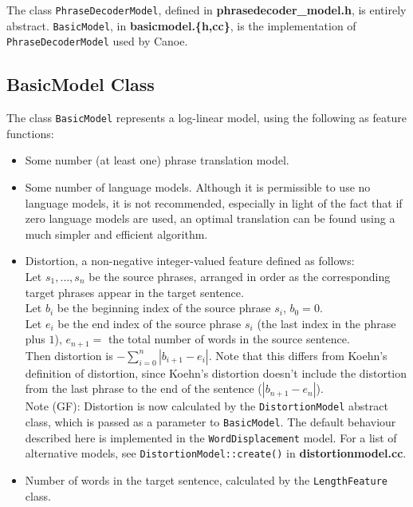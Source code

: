 \documentclass[12pt]{amsart} \usepackage{epsfig} \usepackage{rotating}
\newcommand{\file}{\textbf} \newcommand{\url}{\underline}
\newcommand{\code}{\small\texttt}
\begin{document}
The class \code{PhraseDecoderModel}, defined in \file{phrasedecoder\_model.h},
is entirely abstract.  \code{BasicModel}, in \file{basicmodel.\{h,cc\}}, is the
implementation of \code{PhraseDecoderModel} used by Canoe.

\subsection{BasicModel Class}
The class \code{BasicModel} represents a log-linear model, using the following
as feature functions:

\begin{itemize}

\item
Some number (at least one) phrase translation model.

\item
Some number of language models.  Although it is
permissible to use no language models, it is not recommended, especially in
light of the fact that if zero language models are used, an optimal translation
can be found using a much simpler and efficient algorithm.

\item
Distortion, a non-negative integer-valued feature defined as follows: \\ Let
$s_1, \dots , s_n$ be the source phrases, arranged in order as the
corresponding target phrases appear in the target sentence. \\ Let $b_i$ be the
beginning index of the source phrase $s_i$, $b_0 = 0$. \\ Let $e_i$ be the end
index of the source phrase $s_i$ (the last index in the phrase plus $1$),
$e_{n+1} = $ the total number of words in the source sentence. \\ Then
distortion is $-\sum_{i = 0}^n |b_{i+1} - e_i|$. Note that this differs from
Koehn's definition of distortion, since Koehn's distortion doesn't include
the distortion from the last phrase to the end of the sentence ($|b_{n+1} -
e_n|$).\\[.2cm]
Note (GF): Distortion is now calculated by the \code{DistortionModel} abstract
class, which is passed as a parameter to \code{BasicModel}. The default
behaviour described here is implemented in the  \code{WordDisplacement}
model. For a list of alternative models, see \code{DistortionModel::create()}
in \file{distortionmodel.cc}.
\\[.2cm]

\item
Number of words in the target sentence, calculated by the \code{LengthFeature}
class.


\end{itemize}
\end{document}
